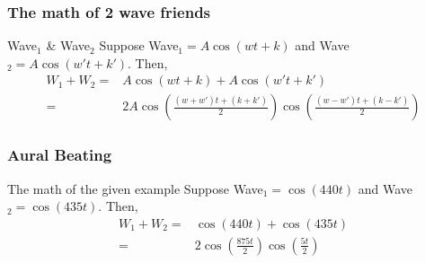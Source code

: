 \documentclass{beamer}
\begin{document}
\begin{frame}
\frametitle{The math of 2 wave friends}
\begin{block}{Wave$_1$ \& Wave$_2$}
Suppose Wave$_1 = A\cos(wt + k)$ and Wave$_2 = A\cos(w't + k')$. Then,
\begin{align*}
W_1 + W_2 =&A\cos(wt + k) + A\cos(w't + k')\\
=&2A\cos(\frac{(w+w')t+(k+k')}{2})\cos(\frac{(w-w')t +(k- k')}{2})
\end{align*}
\end{block}

\end{frame}

\begin{frame}
\frametitle{Aural Beating}
\begin{block}{The math of the given example}
Suppose Wave$_1 = \cos(440t)$ and Wave$_2 = \cos(435t)$. Then,
\begin{align*}
W_1 + W_2 =&\cos(440t) + \cos(435t)\\
=&2\cos(\frac{875t}{2})\cos(\frac{5t}{2})
\end{align*}
\end{block}

\begin{block}{}
\end{block}


\end{frame}
\end{document}

